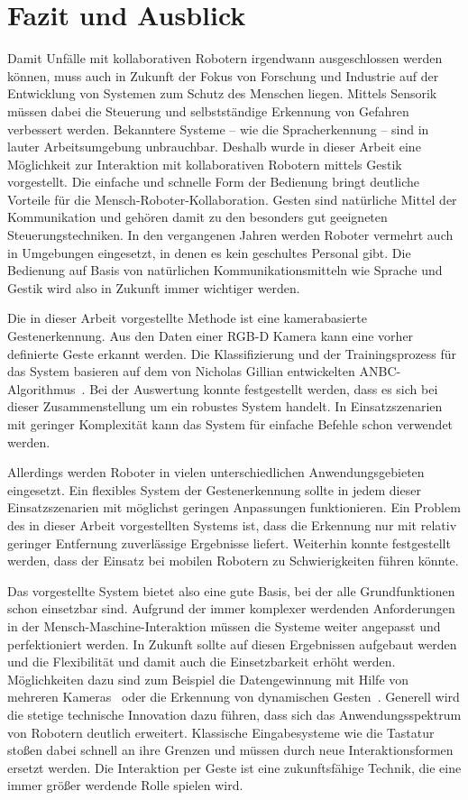 \chapter{Fazit und Ausblick}
Damit Unfälle mit kollaborativen Robotern irgendwann ausgeschlossen werden können, muss auch in Zukunft der Fokus von Forschung und Industrie auf der Entwicklung von Systemen zum Schutz des Menschen liegen. Mittels Sensorik müssen dabei die Steuerung und selbstständige Erkennung von Gefahren verbessert werden. Bekanntere Systeme -- wie die Spracherkennung -- sind in lauter Arbeitsumgebung unbrauchbar. Deshalb wurde in dieser Arbeit eine Möglichkeit zur Interaktion mit kollaborativen Robotern mittels Gestik vorgestellt. Die einfache und schnelle Form der Bedienung bringt deutliche Vorteile für die Mensch-Roboter-Kollaboration. Gesten sind natürliche Mittel der Kommunikation und gehören damit zu den besonders gut geeigneten Steuerungstechniken. In den vergangenen Jahren werden Roboter vermehrt auch in Umgebungen eingesetzt, in denen es kein geschultes Personal gibt. Die Bedienung auf Basis von natürlichen Kommunikationsmitteln wie Sprache und Gestik wird also in Zukunft immer wichtiger werden. 

Die in dieser Arbeit vorgestellte Methode ist eine kamerabasierte Gestenerkennung. Aus den Daten einer RGB-D Kamera kann eine vorher definierte Geste erkannt werden. Die Klassifizierung und der Trainingsprozess für das System basieren auf dem von Nicholas Gillian entwickelten ANBC-Algorithmus~\cite{gillianANBC}. Bei der Auswertung konnte festgestellt werden, dass es sich bei dieser Zusammenstellung um ein robustes System handelt. In Einsatzszenarien mit geringer Komplexität kann das System für einfache Befehle schon verwendet werden.

Allerdings werden Roboter in vielen unterschiedlichen Anwendungsgebieten eingesetzt. Ein flexibles System der Gestenerkennung sollte in jedem dieser Einsatzszenarien mit möglichst geringen Anpassungen funktionieren. Ein Problem des in dieser Arbeit vorgestellten Systems ist, dass die Erkennung nur mit relativ geringer Entfernung zuverlässige Ergebnisse liefert. Weiterhin konnte festgestellt werden, dass der Einsatz bei mobilen Robotern zu Schwierigkeiten führen könnte.

Das vorgestellte System bietet also eine gute Basis, bei der alle Grundfunktionen schon einsetzbar sind. Aufgrund der immer komplexer werdenden Anforderungen in der Mensch-Maschine-Interaktion müssen die Systeme weiter angepasst und perfektioniert werden. In Zukunft sollte auf diesen Ergebnissen aufgebaut werden und die Flexibilität und damit auch die Einsetzbarkeit erhöht werden. Möglichkeiten dazu sind zum Beispiel die Datengewinnung mit Hilfe von mehreren Kameras~\cite{multipleDepthCameras} oder die Erkennung von dynamischen Gesten~\cite{hiddenMarkov}. Generell wird die stetige technische Innovation dazu führen, dass sich das Anwendungsspektrum von Robotern deutlich erweitert. Klassische Eingabesysteme wie die Tastatur stoßen dabei schnell an ihre Grenzen und müssen durch neue Interaktionsformen ersetzt werden. Die Interaktion per Geste ist eine zukunftsfähige Technik, die eine immer größer werdende Rolle spielen wird.  

 